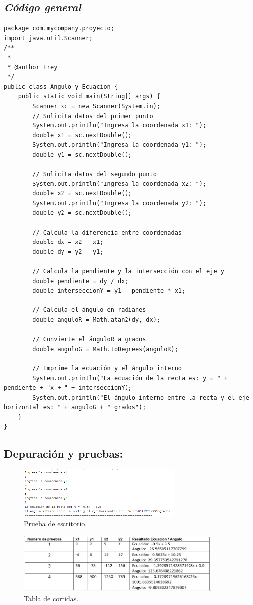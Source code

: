 \subsection{\textbf{\textit{Código general}}}
\begin{lstlisting}[style=javaStyle]
package com.mycompany.proyecto;
import java.util.Scanner;
/**
 *
 * @author Frey
 */
public class Angulo_y_Ecuacion {
    public static void main(String[] args) {
        Scanner sc = new Scanner(System.in);
        // Solicita datos del primer punto
        System.out.println("Ingresa la coordenada x1: ");
        double x1 = sc.nextDouble();
        System.out.println("Ingresa la coordenada y1: ");
        double y1 = sc.nextDouble();
        
        // Solicita datos del segundo punto
        System.out.println("Ingresa la coordenada x2: ");
        double x2 = sc.nextDouble();
        System.out.println("Ingresa la coordenada y2: ");
        double y2 = sc.nextDouble();
        
        // Calcula la diferencia entre coordenadas
        double dx = x2 - x1;
        double dy = y2 - y1;
        
        // Calcula la pendiente y la intersección con el eje y
        double pendiente = dy / dx;
        double interseccionY = y1 - pendiente * x1;
        
        // Calcula el ángulo en radianes
        double anguloR = Math.atan2(dy, dx);
        
        // Convierte el ánguloR a grados
        double anguloG = Math.toDegrees(anguloR);
        
        // Imprime la ecuación y el ángulo interno
        System.out.println("La ecuación de la recta es: y = " + pendiente + "x + " + interseccionY);
        System.out.println("El ángulo interno entre la recta y el eje horizontal es: " + anguloG + " grados");
    }
}
\end{lstlisting}


\subsection{\textbf{Depuración y pruebas:}}
\begin{figure}[H]
    \centering
    \includegraphics[width=8cm]{LaTeX/latex-imagenes/prueba de escritorio2.png}
    \caption{Prueba de escritorio.}
\end{figure}
\begin{figure}[H]
    \centering
    \includegraphics[width=10cm]{LaTeX/latex-imagenes/TABLA.jpg}
    \caption{Tabla de corridas.}
\end{figure}
